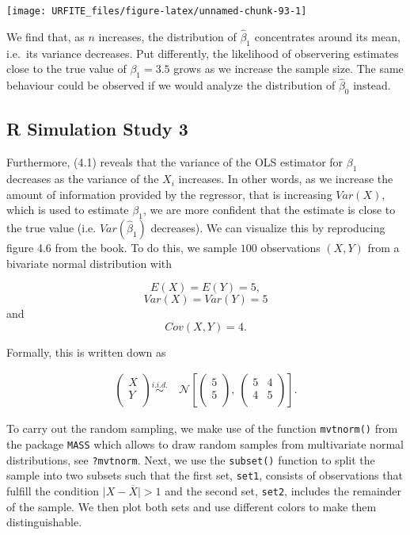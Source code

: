 \documentclass[]{book}
\theoremstyle{definition}
\theoremstyle{definition}
\theoremstyle{definition}
\theoremstyle{remark}
\begin{document}
\begin{center}\texttt{[image: URFITE\_files/figure-latex/unnamed-chunk-93-1]} \end{center}

We find that, as \(n\) increases, the distribution of \(\hat\beta_1\)
concentrates around its mean, i.e.~its variance decreases. Put
differently, the likelihood of observering estimates close to the true
value of \(\beta_1 = 3.5\) grows as we increase the sample size. The
same behaviour could be observed if we would analyze the distribution of
\(\hat\beta_0\) instead.

\subsection*{R Simulation Study 3}\label{r-simulation-study-3}

Furthermore, (4.1) reveals that the variance of the OLS estimator for
\(\beta_1\) decreases as the variance of the \(X_i\) increases. In other
words, as we increase the amount of information provided by the
regressor, that is increasing \(Var(X)\), which is used to estimate
\(\beta_1\), we are more confident that the estimate is close to the
true value (i.e. \(Var(\hat\beta_1)\) decreases). We can visualize this
by reproducing figure 4.6 from the book. To do this, we sample \(100\)
observations \((X,Y)\) from a bivariate normal distribution with

\[E(X)=E(Y)=5,\] \[Var(X)=Var(Y)=5\] and \[Cov(X,Y)=4.\]

Formally, this is written down as

\begin{align}
  \begin{pmatrix}
    X \\
    Y \\
  \end{pmatrix}
  \overset{i.i.d.}{\sim} & \ \mathcal{N} 
  \left[
    \begin{pmatrix}
      5 \\
      5 \\
    \end{pmatrix}, \ 
    \begin{pmatrix}
      5 & 4 \\
      4 & 5 \\
    \end{pmatrix}
  \right]. \tag{4.3}
\end{align}

To carry out the random sampling, we make use of the function
\texttt{mvtnorm()} from the package \texttt{MASS} which allows to draw
random samples from multivariate normal distributions, see
\texttt{?mvtnorm}. Next, we use the \texttt{subset()} function to split
the sample into two subsets such that the first set, \texttt{set1},
consists of observations that fulfill the condition
\(\lvert X - \overline{X} \rvert > 1\) and the second set,
\texttt{set2}, includes the remainder of the sample. We then plot both
sets and use different colors to make them distinguishable.
\end{document}
